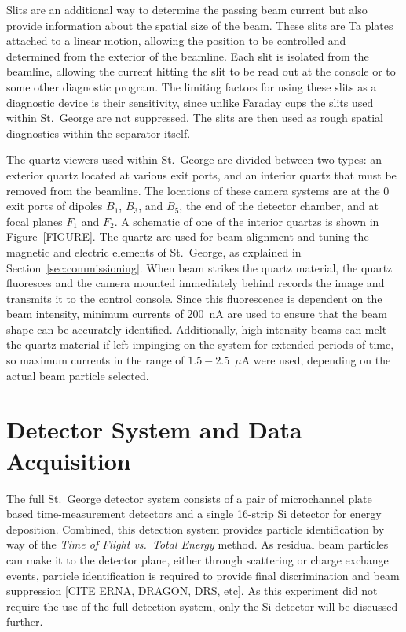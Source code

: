 Slits are an additional way to determine the passing beam current but also
provide information about the spatial size of the beam. These slits are Ta
plates attached to a linear motion, allowing the position to be controlled and
determined from the exterior of the beamline. Each slit is isolated from the
beamline, allowing the current hitting the slit to be read out at the console
or to some other diagnostic program. The limiting factors for using these slits
as a diagnostic device is their sensitivity, since unlike Faraday cups the
slits used within St.\ George are not suppressed. The slits are then used as
rough spatial diagnostics within the separator itself.

The quartz viewers used within St.\ George are divided between two types: an
exterior quartz located at various exit ports, and an interior quartz that must
be removed from the beamline. The locations of these camera systems are at the
0\degree{} exit ports of dipoles $B_1$, $B_3$, and $B_5$, the end of the
detector chamber, and at focal planes $F_1$ and $F_2$. A schematic of one of
the interior quartzs is shown in Figure~[FIGURE]. The quartz are used for beam
alignment and tuning the magnetic and electric elements of St.\ George, as
explained in Section~\ref{sec:commissioning}. When beam strikes the quartz
material, the quartz fluoresces and the camera mounted immediately behind
records the image and transmits it to the control console. Since this
fluorescence is dependent on the beam intensity, minimum currents of 200~nA are
used to ensure that the beam shape can be accurately identified. Additionally,
high intensity beams can melt the quartz material if left impinging on the
system for extended periods of time, so maximum currents in the range of
$1.5-2.5$~$\mu$A were used, depending on the actual beam particle selected.


\section{Detector System and Data Acquisition}
\label{sec:detector}

The full St.\ George detector system consists of a pair of microchannel
plate based time-measurement detectors and a single 16-strip Si detector for
energy deposition. Combined, this detection system provides particle
identification by way of the \textit{Time of Flight vs.\ Total Energy}
method. As residual beam particles can make it to the detector plane, either
through scattering or charge exchange events, particle identification is
required to provide final discrimination and beam suppression
[CITE ERNA, DRAGON, DRS, etc]. As this experiment did not require the use of
the full detection system, only the Si detector will be discussed further.


